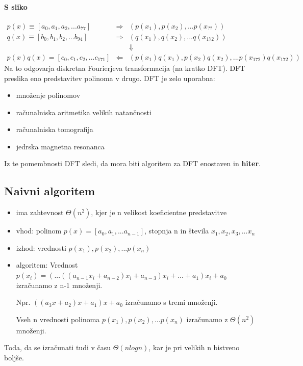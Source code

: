 \documentclass[a4paper,10pt]{article}
\begin{document}
\paragraph{S sliko}
$$
\begin{array}{ccc}
p(x) \equiv \left[ a_0, a_1, a_2,... a_{77} \right]	& \Longrightarrow	& (p(x_1), p(x_2),... p(x_{??}))\\
q(x) \equiv \left[ b_0, b_1, b_2,... b_{94} \right]	& \Longrightarrow	& (q(x_1), q(x_2),... q(x_{172}))\\
	&	& \Downarrow\\
p(x)q(x) = \left[ c_0, c_1, c_2,... c_{171} \right]	& \Longleftarrow	& \left( p(x_1)q(x_1), p(x_2)q(x_2),... p(x_{172})q(x_{172}) \right) 
\end{array}
$$
Na to odgovarja diskretna Fourierjeva transformacija (na kratko DFT). DFT preslika eno predstavitev polinoma v drugo.
DFT je zelo uporabna:
\begin{itemize}
\item mno\v zenje polinomov
\item ra\v cunalniska aritmetika velikih natan\v cnosti
\item ra\v cunalniska tomografija
\item jedrska magnetna resonanca
\end{itemize}
Iz te pomembnosti DFT sledi, da mora biti algoritem za DFT enostaven in \textbf{hiter}.

\subsection{Naivni algoritem}
\begin{itemize}
\item ima zahtevnost $\Theta (n^2)$, kjer je n velikost koeficientne predstavitve
\item vhod: polinom $p(x) = [a_0,a_1,...a_{n-1}]$, stopnja n in \v stevila $x_1, x_2, x_3,...x_n$
\item izhod: vrednosti $p(x_1), p(x_2),... p(x_n)$
\item algoritem:
Vrednost $p(x_i) = (...((a_{n-1}x_i + a_{n-2})x_i + a_{n-3})x_i + ... + a_1)x_i + a_0$ izra\v cunamo z n-1 mno\v zenji.

Npr. $((a_3x + a_2)x + a_1)x + a_0$ izra\v cunamo s tremi mno\v zenji.

Vseh n vrednosti polinoma $p(x_1), p(x_2),... p(x_n)$ izra\v cunamo z $\Theta (n^2)$ mno\v zenji.
\end{itemize}
Toda, da se izra\v cunati tudi v \v casu $\Theta (n log n)$, kar je pri velikih n bistveno bolj\v se.
\end{document}
